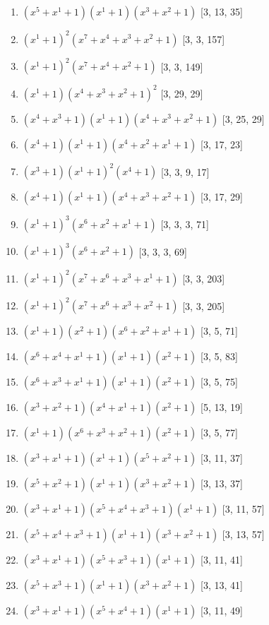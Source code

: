 \documentclass[10pt,twocolumn]{article}
\begin{document}
\begin{enumerate}
\item $(x^{5} + x^{1} + 1)(x^{1} + 1)(x^{3} + x^{2} + 1)$  [3, 13, 35]
\item $(x^{1} + 1)^{2}(x^{7} + x^{4} + x^{3} + x^{2} + 1)$  [3, 3, 157]
\item $(x^{1} + 1)^{2}(x^{7} + x^{4} + x^{2} + 1)$  [3, 3, 149]
\item $(x^{1} + 1)(x^{4} + x^{3} + x^{2} + 1)^{2}$  [3, 29, 29]
\item $(x^{4} + x^{3} + 1)(x^{1} + 1)(x^{4} + x^{3} + x^{2} + 1)$  [3, 25, 29]
\item $(x^{4} + 1)(x^{1} + 1)(x^{4} + x^{2} + x^{1} + 1)$  [3, 17, 23]
\item $(x^{3} + 1)(x^{1} + 1)^{2}(x^{4} + 1)$  [3, 3, 9, 17]
\item $(x^{4} + 1)(x^{1} + 1)(x^{4} + x^{3} + x^{2} + 1)$  [3, 17, 29]
\item $(x^{1} + 1)^{3}(x^{6} + x^{2} + x^{1} + 1)$  [3, 3, 3, 71]
\item $(x^{1} + 1)^{3}(x^{6} + x^{2} + 1)$  [3, 3, 3, 69]
\item $(x^{1} + 1)^{2}(x^{7} + x^{6} + x^{3} + x^{1} + 1)$  [3, 3, 203]
\item $(x^{1} + 1)^{2}(x^{7} + x^{6} + x^{3} + x^{2} + 1)$  [3, 3, 205]
\item $(x^{1} + 1)(x^{2} + 1)(x^{6} + x^{2} + x^{1} + 1)$  [3, 5, 71]
\item $(x^{6} + x^{4} + x^{1} + 1)(x^{1} + 1)(x^{2} + 1)$  [3, 5, 83]
\item $(x^{6} + x^{3} + x^{1} + 1)(x^{1} + 1)(x^{2} + 1)$  [3, 5, 75]
\item $(x^{3} + x^{2} + 1)(x^{4} + x^{1} + 1)(x^{2} + 1)$  [5, 13, 19]
\item $(x^{1} + 1)(x^{6} + x^{3} + x^{2} + 1)(x^{2} + 1)$  [3, 5, 77]
\item $(x^{3} + x^{1} + 1)(x^{1} + 1)(x^{5} + x^{2} + 1)$  [3, 11, 37]
\item $(x^{5} + x^{2} + 1)(x^{1} + 1)(x^{3} + x^{2} + 1)$  [3, 13, 37]
\item $(x^{3} + x^{1} + 1)(x^{5} + x^{4} + x^{3} + 1)(x^{1} + 1)$  [3, 11, 57]
\item $(x^{5} + x^{4} + x^{3} + 1)(x^{1} + 1)(x^{3} + x^{2} + 1)$  [3, 13, 57]
\item $(x^{3} + x^{1} + 1)(x^{5} + x^{3} + 1)(x^{1} + 1)$  [3, 11, 41]
\item $(x^{5} + x^{3} + 1)(x^{1} + 1)(x^{3} + x^{2} + 1)$  [3, 13, 41]
\item $(x^{3} + x^{1} + 1)(x^{5} + x^{4} + 1)(x^{1} + 1)$  [3, 11, 49]

\end{enumerate}
\end{document}

